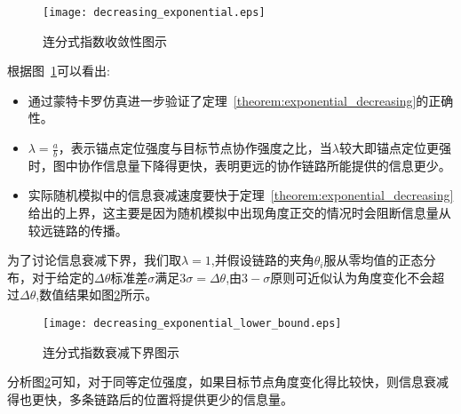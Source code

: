 \begin{figure}
  \centering
  \texttt{[image: decreasing\_exponential.eps]}
  \caption{连分式指数收敛性图示}\label{fig:continuous_fraction_exponential}
\end{figure}
根据图~\ref{fig:continuous_fraction_exponential}可以看出:
\begin{itemize}
\item 通过蒙特卡罗仿真进一步验证了定理~\ref{theorem:exponential_decreasing}的正确性。
\item $\lambda=\frac{a}{b}$，表示锚点定位强度与目标节点协作强度之比，当$\lambda$较大即锚点定位更强时，图中协作信息量下降得更快，表明更远的协作链路所能提供的信息更少。
\item 实际随机模拟中的信息衰减速度要快于定理~\ref{theorem:exponential_decreasing}给出的上界，这主要是因为随机模拟中出现角度正交的情况时会阻断信息量从较远链路的传播。\end{itemize}

为了讨论信息衰减下界，我们取$\lambda=1$,并假设链路的夹角$\theta_i$服从零均值的正态分布，对于给定的$\Delta \theta$标准差$\sigma$满足$3\sigma=\Delta \theta$,由$3-\sigma$原则可近似认为角度变化不会超过$\Delta \theta$,数值结果如图\ref{fig:continuous_fraction_exponential_lower_bound}所示。
    \begin{figure}
      \centering
      \texttt{[image: decreasing\_exponential\_lower\_bound.eps]}
      \caption{连分式指数衰减下界图示}\label{fig:continuous_fraction_exponential_lower_bound}
    \end{figure}

    分析图\ref{fig:continuous_fraction_exponential_lower_bound}可知，对于同等定位强度，如果目标节点角度变化得比较快，则信息衰减得也更快，多条链路后的位置将提供更少的信息量。



